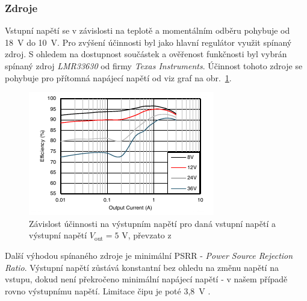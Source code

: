 \documentclass[twoside]{ctuthesis}
\newcommand{\mt}[1]{\text{#1}}
\theoremstyle{plain}
\theoremstyle{definition}
\theoremstyle{note}
\begin{document}
			\subsubsection{Zdroje}
			Vstupní napětí se v závislosti na teplotě a momentálním odběru pohybuje od 18~V do 10~V. Pro zvýšení účinnosti byl jako hlavní regulátor využit spínaný zdroj. S ohledem na dostupnost součástek a ověřenost funkčnosti byl vybrán spínaný zdroj \textit{LMR33630} od firmy \textit{Texas Instruments}. Účinnost tohoto zdroje se pohybuje pro přítomná napájecí napětí od viz graf na obr.~\ref{graf:lmr}.
			\begin{figure}[hbtp]
				\centering
				\includegraphics[width=.6\textwidth]{Graphs/lmr33630eff.pdf}
				\caption{Závislost účinnosti na výstupním napětí pro daná vstupní napětí a výstupní napětí $V_\mt{out}= 5\mt{ V}$, převzato z \cite{dsh_lmr}}
				\label{graf:lmr}
			\end{figure}

			Další výhodou spínaného zdroje je minimální PSRR - \textit{Power Source Rejection Ratio}. Výstupní napětí zůstává konstantní bez ohledu na změnu napětí na vstupu, dokud není překročeno minimální napájecí napětí - v našem případě rovno výstupnímu napětí. Limitace čipu je poté 3{,}8~V \cite{dsh_lmr}.
			
\end{document}
